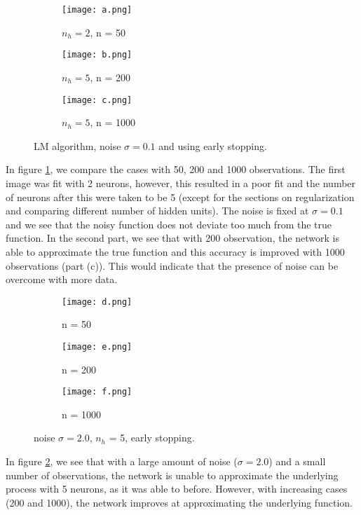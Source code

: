 \documentclass[paper=a4, fontsize=11pt]{scrartcl} %
\numberwithin{equation}{section} %
\begin{document}
\begin{figure}[ht]
\centering
	\begin{subfigure}[b]{0.3\textwidth}
	\centering
	\texttt{[image: a.png]}
	\caption{$n_h=2$, n = 50}
	\end{subfigure}
\begin{subfigure}[b]{0.3\textwidth}
	\centering
	\texttt{[image: b.png]}
	\caption{$n_h=5$, n = 200}
	\end{subfigure}
\begin{subfigure}[b]{0.3\textwidth}
	\centering
	\texttt{[image: c.png]}
	\caption{$n_h=5$, n = 1000}
	\end{subfigure}
\caption{LM algorithm, noise $\sigma=0.1$ and using early stopping.}
\label{nobs1}
\end{figure}

In figure \ref{nobs1}, we  compare the cases with 50, 200 and 1000 observations. The first image was fit with 2 neurons, however, this resulted in a poor fit and the number of neurons after this were taken to be 5 (except for the sections on regularization and comparing different number of hidden units). The noise is fixed at $\sigma=0.1$ and we see that the noisy function does not deviate too much from the true function. In the second part, we see that with 200 observation, the network is able to approximate the true function and this accuracy is improved with 1000 observations (part (c)). This would indicate that the presence of noise can be overcome with more data.

\begin{figure}[ht]
\centering
	\begin{subfigure}[b]{0.3\textwidth}
	\centering
	\texttt{[image: d.png]}
	\caption{n = 50}
	\end{subfigure}
\begin{subfigure}[b]{0.3\textwidth}
	\centering
	\texttt{[image: e.png]}
	\caption{n = 200}
	\end{subfigure}
\begin{subfigure}[b]{0.3\textwidth}
	\centering
	\texttt{[image: f.png]}
	\caption{n = 1000}
	\end{subfigure}
\caption{noise $\sigma=2.0$, $n_h$ = 5, early stopping.}
\label{nobs2}
\end{figure}

In figure \ref{nobs2}, we see that with a large amount of noise ($\sigma=2.0$) and a small number of observations, the network is unable to approximate the underlying process with 5 neurons, as it was able to before. However, with increasing cases (200 and 1000), the network improves at approximating the underlying function.\\
\end{document}
